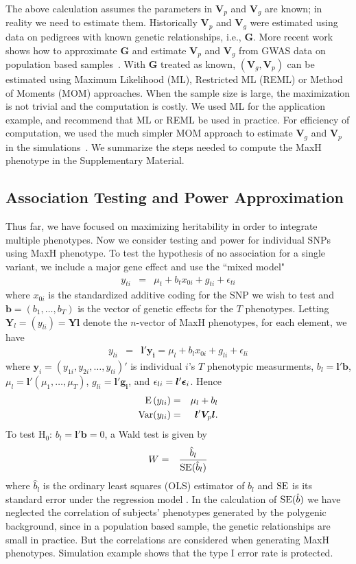 \documentclass[11pt]{article}
\def\E{\mathop{\rm E\,}\nolimits}
\def\Var{\mathop{\rm Var}\nolimits}
\def\SE{\mathop{\rm SE}\nolimits}
\def\E{\mathop{\rm E\,}\nolimits}
\def\Var{\mathop{\rm Var}\nolimits}
\newcommand{\bea}{\begin{eqnarray}}
\newcommand{\eea}{\end{eqnarray}}
\newcommand{\beaa}{\begin{eqnarray*}}
\newcommand{\eeaa}{\end{eqnarray*}}
\newcommand{\Gbf}{{\bm G}}
\newcommand{\Vbf}{{\bm V}}
\newcommand{\Ybf}{{\bm Y}}
\newcommand{\bbf}{{\bm b}}
\newcommand{\lbf}{{\bm l}}
\newcommand{\ybf}{{\bm y}}
\newcommand{\greekbold}[1]{\mbox{\boldmath $#1$}}
\newcommand{\epsilonbf}{\greekbold{\epsilon}}
\begin{document}
The above calculation assumes the parameters in $\Vbf_p$ and $\Vbf_g$ are known; in reality we need to estimate them. Historically $\Vbf_p$ and $\Vbf_g$ were estimated using data on pedigrees with known genetic relationships, i.e., $\Gbf$. More recent work  shows how to approximate $\Gbf$ and estimate $\Vbf_p$ and $\Vbf_g$ from GWAS data on population based samples~\citep{Yang:2010zr}. With $\Gbf$ treated as known, $(\Vbf_g, \Vbf_p)$ can be estimated using Maximum Likelihood (ML), Restricted ML (REML) or Method of Moments (MOM) approaches. When the sample size is large, the maximization is not trivial and the computation is costly.  We used ML for the application example, and recommend that ML or REML be used in practice. For efficiency of computation, we used the much simpler MOM approach to estimate $\Vbf_g$ and $\Vbf_p$ in the simulations~\citep{LangeStatGen}. We summarize the steps needed to compute the MaxH phenotype in the Supplementary Material.

\subsection{Association Testing and Power Approximation}\label{sec:method_testing} 
Thus far, we have focused on maximizing heritability in order to integrate multiple phenotypes. Now we consider testing and power for individual SNPs using MaxH phenotype.  To test the hypothesis of no association for a single variant, we include a major gene effect and use the ``mixed model" \citep{Korte:2012kx}
\bea
y_{ti}&=&\mu_{t}+b_tx_{0i}+g_{ti}+\epsilon_{ti}\label{mixed1}
\eea
where $x_{0i}$ is the standardized additive coding for the SNP we wish to test and $\bbf=(b_1,\ldots,b_T)$ is the vector of genetic effects for the $T$ phenotypes. Letting $\Ybf_{l}=(y_{li})=\Ybf \lbf$ denote the $n$-vector of MaxH phenotypes, for each element, we have 
\beaa
y_{li}&=&\lbf'\bm{y_i}=\mu_l+b_lx_{0i}+g_{li}+\epsilon_{li}
\eeaa
where $\ybf_i=(y_{1i},y_{2i},\ldots,y_{ti})'$ is individual $i$'s $T$ phenotypic measurments, $b_l=\lbf'\bm{b}$, $\mu_l=\lbf'(\mu_1,\ldots,\mu_T)$, $g_{li}=\lbf'\bm{g_i}$,  and $\epsilon_{li}=\lbf'\epsilonbf_i$. Hence
\beaa
\E(y_{li})&=&\mu_l+b_l\\
\Var(y_{li})&=&\lbf'\Vbf_p\lbf.
\eeaa
To test $\mbox{H}_0:\, b_l=\lbf'\bm{b}=0$, a Wald test is given by
\bea
W&=&\frac{\hat{b}_l}{\SE(\hat{b}_l)}\label{eq:waldstat}
\eea
where $\hat{b}_l$ is the ordinary least squares (OLS) estimator of $b_l$ and $\SE$ is its standard error under the regression model  \citep{Klei:2008fk}.  In the calculation of $\SE(\hat{b})$ we have neglected the correlation of subjects' phenotypes generated by the polygenic background, since in a population based sample, the genetic relationships are small in practice. But the correlations are considered when generating MaxH phenotypes. Simulation example shows that the type I error rate is protected.
\end{document}

